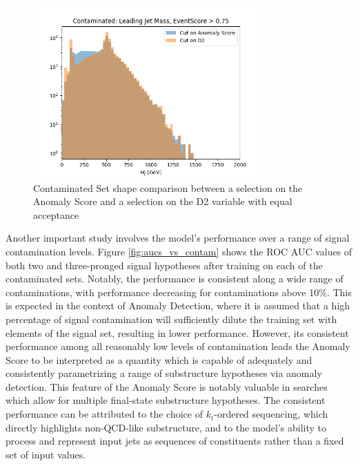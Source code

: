 \documentclass[12pt, a4paper]{article}
\begin{document}
\begin{figure}[H]
	\begin{center}
		\includegraphics[width=250pt]{imgs/2Prong_Contaminated_10p0_J_Mass_EventScore0p75_Multi_D2Comp.png}
	\end{center}
	\caption{Contaminated Set shape comparison between a selection on the Anomaly Score and a selection on the D2 variable with equal acceptance}
	\label{fig:d2_comp}
\end{figure}

Another important study involves the model's performance over a range of signal contamination levels. Figure \ref{fig:aucs_vs_contam} shows the ROC AUC values of both two and three-pronged signal hypotheses after training on each of the contaminated sets. Notably, the performance is consistent along a wide range of contaminations, with performance decreasing for contaminations above 10\%. This is expected in the context of Anomaly Detection, where it is assumed that a high percentage of signal contamination will sufficiently dilute the training set with elements of the signal set, resulting in lower performance. However, its consistent performance among all reasonably low levels of contamination leads the Anomaly Score to be interpreted as a quantity which is capable of adequately and consistently parametrizing a range of substructure hypotheses via anomaly detection. This feature of the Anomaly Score is notably valuable in searches which allow for multiple final-state substructure hypotheses. The consistent performance can be attributed to the choice of $k_{t}$-ordered sequencing, which directly highlights non-QCD-like substructure, and to the model's ability to process and represent input jets as sequences of constituents rather than a fixed set of input values. 
\end{document}
